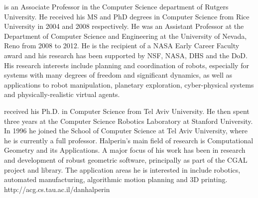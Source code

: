 \vspace{0.2in}

 is an Associate Professor in the
Computer Science department of Rutgers University. He received his MS and PhD degrees in Computer Science from Rice University in 2004 and 2008 respectively. He was an Assistant
Professor at the Department of Computer Science and Engineering at the
University of Nevada, Reno from 2008 to 2012. He is the recipient of a
NASA Early Career Faculty award and his research has been supported by
NSF, NASA, DHS and the DoD. His research interests include planning
and coordination of robots, especially for systems with many degrees
of freedom and significant dynamics, as well as applications to
robot manipulation, planetary exploration, cyber-physical systems
and physically-realistic virtual agents. 

\vspace{0.2in}
 received his Ph.D. in Computer Science from Tel Aviv University. He then spent three years at the Computer Science
Robotics Laboratory at Stanford University. In 1996 he joined the
School of Computer Science at Tel Aviv University, where he is
currently a full professor. Halperin's main field of research is
Computational Geometry and its Applications. A major focus of his
work has been in research and development of robust geometric
software, principally as part of the CGAL project and library. The
application areas he is interested in include robotics, automated
manufacturing, algorithmic motion planning and 3D printing.
http://acg.cs.tau.ac.il/danhalperin\\